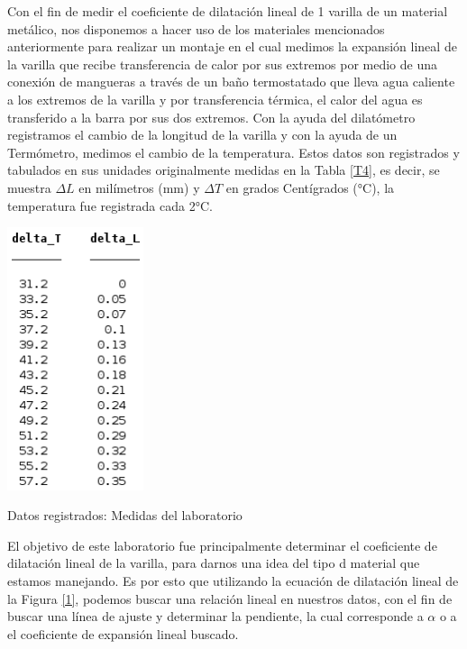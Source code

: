 \documentclass[journal,transmag]{IEEEtran}
\begin{document}
Con el fin de medir el coeficiente de dilatación lineal de 1 varilla de un material metálico, nos disponemos a hacer uso de los materiales mencionados anteriormente para realizar un montaje en el cual medimos la expansión lineal de la varilla que recibe transferencia de calor por sus extremos por medio de una conexión de mangueras a través de un baño termostatado que lleva agua caliente a los extremos de la varilla y por transferencia térmica, el calor del agua es transferido a la barra por sus dos extremos. Con la ayuda del dilatómetro registramos el cambio de la longitud de la varilla y con la ayuda de un Termómetro, medimos el cambio de la temperatura. Estos datos son registrados y tabulados en sus unidades originalmente medidas en la Tabla \ref{T4}, es decir, se muestra $\Delta L$  en milímetros (mm) y $\Delta T$  en grados Centígrados (°C), la temperatura fue registrada cada 2°C. 

  

\begin{table}[!h] 

\center 

\includegraphics[width=4cm]{rawData.png} 

\caption{Datos registrados: Medidas del laboratorio} 

\label{T4} 

\end{table} 

  

El objetivo de este laboratorio fue principalmente determinar el coeficiente de dilatación lineal de la varilla, para darnos una idea del tipo d material que estamos manejando. Es por esto que utilizando la ecuación de dilatación lineal de la Figura \ref{1}, podemos buscar una relación lineal en nuestros datos, con el fin de buscar una línea de ajuste y determinar la pendiente, la cual corresponde a $\alpha$ o a el coeficiente de expansión lineal buscado. 
\end{document}
